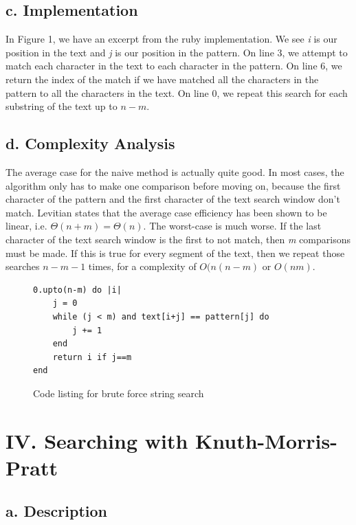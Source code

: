 \documentclass{chi2005}
\begin{document}
\subsection{c. Implementation}

In Figure 1, we have an excerpt from the ruby implementation. We see \emph{i} is our position in the text and \emph{j} is our position in the pattern. On line 3, we attempt to match each character in the text to each character in the pattern. On line 6, we return the index of the match if we have matched all the characters in the pattern to all the characters in the text. On line 0, we repeat this search for each substring of the text up to $n-m$.

\subsection{d. Complexity Analysis}

The average case for the naive method is actually quite good. In most cases, the algorithm only has to make one comparison before moving on, because the first character of the pattern and the first character of the text search window don't match. Levitian\cite{lev} states that the average case efficiency has been shown to be linear, i.e. $\Theta(n+m) = \Theta(n)$. The worst-case is much worse. If the last character of the text search window is the first to not match, then \emph{m} comparisons must be made. If this is true for every segment of the text, then we repeat those searches $n-m-1$ times, for a complexity of $O(n(n-m)$ or $O(nm)$.

\begin{figure}
\begin{lstlisting}
0.upto(n-m) do |i|
	j = 0
	while (j < m) and text[i+j] == pattern[j] do
		j += 1
	end
	return i if j==m
end
\end{lstlisting}
\caption{Code listing for brute force string search}
\label{figure1}
\end{figure}


\section{IV. Searching with Knuth-Morris-Pratt}

\subsection{a. Description}
\end{document}
